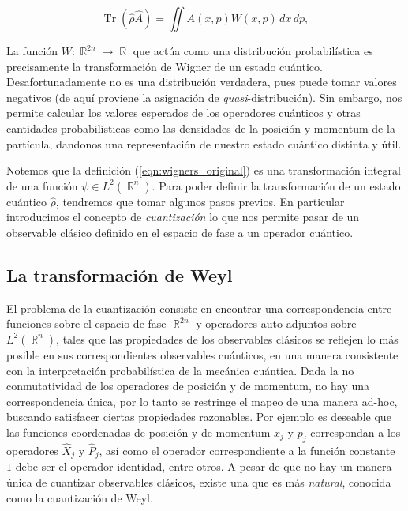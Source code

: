 \documentclass[a4paper]{report}
\DeclareMathOperator{\R}{\mathbb{R}}
\DeclareMathOperator{\Tr}{Tr}
\begin{document}
  \begin{equation}
    \Tr\left(\hat{\rho} \hat{A}\right)
    = \iint A(x,p)W(x,p) \, dx \, dp,
  \end{equation}

  La función $W : \R^{2n} \to \R$ que actúa como una
  distribución probabilística es precisamente la
  transformación de Wigner de un estado cuántico.
  Desafortunadamente no es una distribución verdadera, pues
  puede tomar valores negativos (de aquí proviene la
  asignación de \textit{quasi}-distribución). Sin embargo,
  nos permite calcular los valores esperados de los
  operadores cuánticos y otras cantidades probabilísticas
  como las densidades de la posición y momentum de la
  partícula, dandonos una representación de nuestro estado
  cuántico distinta y útil.

  Notemos que la definición (\ref{eqn:wigners_original}) es
  una transformación integral de una función $\psi \in
  L^2(\R^{n})$. Para poder definir la transformación de un
  estado cuántico $\hat{\rho}$, tendremos que tomar algunos
  pasos previos. En particular introducimos el concepto de
  \textit{cuantización} lo que nos permite pasar de un
  observable clásico definido en el espacio de fase a un
  operador cuántico.

  \subsection{La transformación de Weyl}

  El problema de la cuantización consiste en encontrar una
  correspondencia entre funciones sobre el espacio de fase
  $\R^{2n}$ y operadores auto-adjuntos sobre $L^2(\R^{n})$,
  tales que las propiedades de los observables clásicos se
  reflejen lo más posible en sus correspondientes
  observables cuánticos, en una manera consistente con la
  interpretación probabilística de la mecánica cuántica.
  Dada la no conmutatividad de los operadores de posición y
  de momentum, no hay una correspondencia única, por lo
  tanto se restringe el mapeo de una manera ad-hoc, buscando
  satisfacer ciertas propiedades razonables. Por ejemplo es
  deseable que las funciones coordenadas de posición y de
  momentum $x_j$ y $p_j$ correspondan a los operadores
  $\hat{X}_j$ y $\hat{P}_j$, así como el operador
  correspondiente a la función constante $1$ debe ser el
  operador identidad, entre otros.  A pesar de que no hay un
  manera única de cuantizar observables clásicos, existe una
  que es más \textit{natural}, conocida como la cuantización
  de Weyl. 
\end{document}
